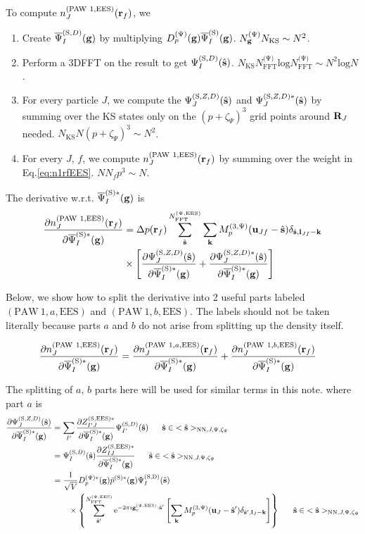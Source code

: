 \documentclass[paper=a4, fontsize=11pt]{article} %
\numberwithin{equation}{section} %
\numberwithin{figure}{section} %
\numberwithin{table}{section} %
\newcommand{\p}{\partial}
\newcommand{\ol}{\overline}
\newcommand{\bu}{{\bf{u}}}
\newcommand{\bl}{{\bf{l}}}
\newcommand{\bk}{{\bf{k}}}
\newcommand{\bs}{{\bf{s}}}
\newcommand{\bg}{{\bf{g}}}
\newcommand{\br}{{\bf{r}}}
\newcommand{\bR}{{\bf{R}}}
\newcommand{\hs}{{\hat{\bf{s}}}}
\newcommand{\rS}{{\mathrm{S}}}
\newcommand{\rEES}{{\mathrm{EES}}}
\newcommand{\rNN}{{\mathrm{NN}}}
\newcommand{\re}{{\mathrm{e}}}
\newcommand{\rP}{{\mathrm{PAW}}}
\newcommand{\rD}{{\mathrm{D}}}
\newcommand{\rl}{{\mathrm{log}}}
\newcommand{\gcpEES}{{\bg_c^{(\Psi,\rEES)}}}
\newcommand{\psigs}{{\overline \Psi_I^{(\rS)}(\bg)}}
\newcommand{\psigsc}{{\overline \Psi_I^{(\rS)*}(\bg)}}
\newcommand{\NKS}{{N_{\mathrm{KS}}}}
\newcommand{\NFFTp}{{N^{\mathrm{(\Psi})}_{\mathrm{FFT}}}}
\newcommand{\NFFTpEES}{{N^{\mathrm{(\Psi,\rEES})}_{\mathrm{FFT}}}}
\newcommand{\NgKS}{{N^{\mathrm{(\Psi})}_\bg}}
\newcommand{\Dpg}{{D^{(\Psi)}_p(\bg)}}
\newcommand{\Dpgc}{{D^{(\Psi)*}_p(\bg)}}
\newcommand{\Mp}{{M_p^{(3,\Psi)}}}
\newcommand{\pzp}{{(p+\zeta_{\Psi})^3}}
\newcommand{\hsJp}{{<\hs>_{\rNN,J,\Psi,\zeta_\Psi}}}
\newcommand{\hsinJp}{{\ \ \ \ \ \hs  \in  \hsJp}}
\begin{document}
To compute $n_J^{(\rP\ 1,\rEES)}(\br_f)$, we
\begin{enumerate}
\item Create $\ol \Psi_I^{(\rS,D)}(\bg)$ by multiplying $\Dpg\psigs$. $\NgKS \NKS \sim N^2$.
\item Perform a 3DFFT on the result to get $\Psi_I^{(\rS,D)}(\hs)$. $\NKS\NFFTp \rl \NFFTp \sim N^2 \rl N$.
\item For every particle $J$, we compute the $\Psi_J^{(\rS,Z,D)}(\hat \bs)$ and $\Psi_J^{(\rS,Z,D)*}(\hat \bs)$ by summing over the KS states only on the $\pzp$ grid points around $\bR_J$ needed. $\NKS N \pzp \sim N^2$.
\item For every $J$, $f$, we compute $n_J^{(\rP\ 1,\rEES)}(\br_f)$ by summing over the weight in Eq.\eqref{eq:n1rfEES}. $N N_f p^3 \sim N$.
\end{enumerate}

The derivative w.r.t. $\psigsc$ is
\begin{equation}\label{eq:dn1rfdp}
\begin{split}
\frac{\p n_J^{(\rP\ 1,\rEES)}(\br_f)}{\p \psigsc}
&= \Delta p(\br_f)\sum_{\hat \bs}^{\NFFTpEES} \sum_{\bk} \Mp(\bu_{Jf}-\hat \bs)\delta_{\hat \bs,\bl_{Jf}-\bk}\\
&\times \left[\frac{\p \Psi_J^{(\rS,Z,D)}(\hs)}{\p \psigsc}+ \frac{\p \Psi_J^{(\rS,Z,D)*}(\hs)}{\p \psigsc}\right]\\
\end{split}
\end{equation}

Below, we show how to split the derivative into 2 useful parts labeled  $(\rP\ 1,a,\rEES)$ and $(\rP\ 1,b,\rEES)$. The labels should not be taken literally because parts $a$ and $b$ do not arise from splitting up the density itself.

\begin{equation}
\begin{split}
\frac{\p n_J^{(\rP\ 1,\rEES)}(\br_f)}{\p \psigsc} &= \frac{\p n_J^{(\rP\ 1,a,\rEES)}(\br_f)}{\p \psigsc} + \frac{\p n_J^{(\rP\ 1,b,\rEES)}(\br_f)}{\p \psigsc}
\end{split}
\end{equation}


The splitting of $a$, $b$ parts here will be used for similar terms in this note. where part $a$ is
\begin{equation}\label{eq:dZSDdpsi}
\begin{split}
\frac{\p \Psi_J^{(\rS,Z,D)}(\hs)}{\p \psigsc}
&= \sum_{I'} \frac{\p Z_{I'J}^{(\rS,
\rEES)*}}{\p \psigsc} \Psi_{I'}^{(\rS,D)}(\hat \bs)\hsinJp \\
&= \Psi_{I}^{(\rS,D)}(\hat \bs)\frac{\p Z_{IJ}^{(\rS,\rEES)*}}{\p \psigsc}\hsinJp\\
&= \frac{1}{\sqrt{V}} \Dpgc \tilde p^{(\rS)*}(\bg) \Psi_{I}^{(\rS,\rD)}(\hat \bs) \\
&\ \ \ \ \ \ \times \left\{\sum_{\hat \bs'}^{\NFFTpEES} \re^{-2\pi i\gcpEES \cdot \hat\bs'} \left[\sum_{\bk} \Mp(\bu_{J}-\hat \bs') \delta_{\hat \bs',\bl_J-\bk}\right]\right\} \hsinJp \\
\end{split}
\end{equation}
\end{document}
